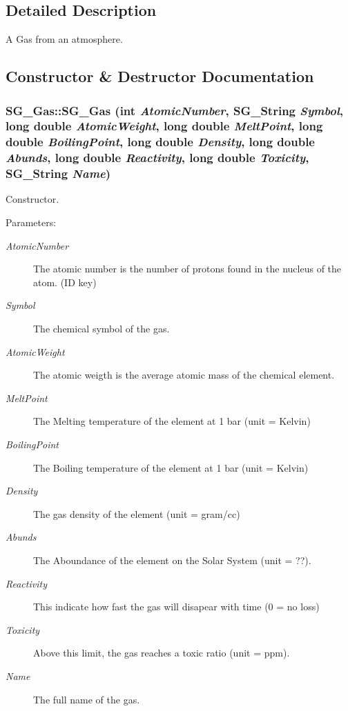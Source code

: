 \subsection{Detailed Description}
A Gas from an atmosphere. 



\subsection{Constructor \& Destructor Documentation}
\subsubsection{\setlength{\rightskip}{0pt plus 5cm}SG\_\-Gas::SG\_\-Gas (int {\em Atomic\-Number}, SG\_\-String {\em Symbol}, long double {\em Atomic\-Weight}, long double {\em Melt\-Point}, long double {\em Boiling\-Point}, long double {\em Density}, long double {\em Abunds}, long double {\em Reactivity}, long double {\em Toxicity}, SG\_\-String {\em Name})}\label{class_s_g___gas_a0}


Constructor. 

\begin{Desc}
\item[Parameters:]
\begin{description}
\item[{\em Atomic\-Number}]The atomic number is the number of protons found in the nucleus of the atom. (ID key) \item[{\em Symbol}]The chemical symbol of the gas. \item[{\em Atomic\-Weight}]The atomic weigth is the average atomic mass of the chemical element. \item[{\em Melt\-Point}]The Melting temperature of the element at 1 bar (unit = Kelvin) \item[{\em Boiling\-Point}]The Boiling temperature of the element at 1 bar (unit = Kelvin) \item[{\em Density}]The gas density of the element (unit = gram/cc) \item[{\em Abunds}]The Aboundance of the element on the Solar System (unit = ??). \item[{\em Reactivity}]This indicate how fast the gas will disapear with time (0 = no loss) \item[{\em Toxicity}]Above this limit, the gas reaches a toxic ratio (unit = ppm). \item[{\em Name}]The full name of the gas. \end{description}
\end{Desc}


